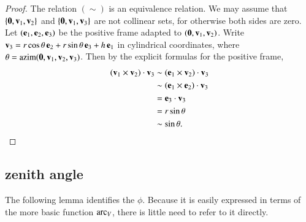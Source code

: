 \begin{proof}
  The relation $(\sim)$ is an equivalence relation.  We may assume that
  $\{{\mathbf 0},{\mathbf v}_1,{\mathbf v}_2\}$ and $\{{\mathbf 0},{\mathbf v}_1,{\mathbf v}_3\}$ are not collinear
  sets, for otherwise both sides are zero.  Let $({\mathbf e}_1,{\mathbf e}_2,{\mathbf e}_3)$ be
  the positive frame adapted to $({\mathbf 0},{\mathbf v}_1,{\mathbf v}_2)$.
Write ${\mathbf v}_3= r\cos\theta\, {\mathbf e}_2 + r\sin\theta \, {\mathbf e}_3 + h\, {\mathbf e}_1$ in
cylindrical coordinates, where $\theta =
{\operatorname{azim}}({\mathbf 0},{\mathbf v}_1,{\mathbf v}_2,{\mathbf v}_3)$.  Then by the explicit formulas for
the positive frame,
\begin{align*}
({\mathbf v}_1\times {\mathbf v}_2)\cdot {\mathbf v}_3 &\sim ({\mathbf e}_1\times {\mathbf v}_2)\cdot {\mathbf v}_3\\
&\sim ({\mathbf e}_1\times {\mathbf e}_2)\cdot {\mathbf v}_3\\
&= {\mathbf e}_3 \cdot {\mathbf v}_3\\
&= r\sin\theta \\
&\sim \sin\theta.
\end{align*}
\end{proof}


\subsection{zenith angle}
\label{sec:spherical}


%




The following lemma identifies the  $\phi$.  Because it is
easily expressed in terms of the more basic function $\operatorname{arc}_V$, there
is little need to refer to it directly.
%

